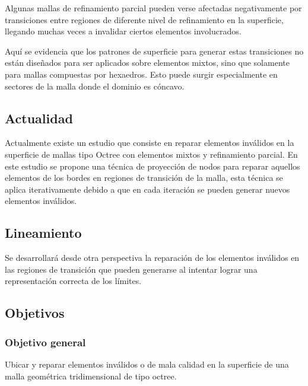 Algunas mallas de refinamiento parcial pueden verse afectadas negativamente por transiciones entre regiones de diferente nivel de refinamiento en la superficie, llegando muchas veces a invalidar ciertos elementos involucrados. 


Aquí se evidencia que los patrones de superficie para generar estas transiciones no están diseñados para ser aplicados sobre elementos mixtos, sino que solamente para mallas compuestas por hexaedros.  Esto puede surgir especialmente en sectores de la malla donde el dominio es cóncavo. 

\subsection{Actualidad}

Actualmente existe un estudio \cite{daines2018repairing} que consiste en reparar elementos inválidos en la superficie de mallas tipo Octree con elementos mixtos y refinamiento parcial. En este estudio se propone una técnica de proyección de nodos para reparar aquellos elementos de los bordes en regiones de transición de la malla, esta técnica se aplica iterativamente debido a que en cada iteración se pueden generar nuevos elementos inválidos.

\subsection{Lineamiento}



Se desarrollará desde otra perspectiva la reparación de los elementos inválidos en las regiones de transición que pueden generarse al intentar lograr una representación correcta de los límites.



\subsection{Objetivos}
\subsubsection{Objetivo general}
Ubicar y reparar elementos inválidos o de mala calidad en la superficie de una malla geométrica tridimensional de tipo octree.

